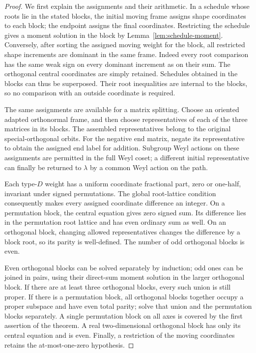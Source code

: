 \begin{proof}
We first explain the assignments and their arithmetic.  In a schedule
whose roots lie in the stated blocks, the initial moving frame assigns
shape coordinates to each block; the endpoint assigns the final
coordinates.  Restricting the schedule gives a moment solution in the
block by Lemma~\ref{lem:schedule-moment}.  Conversely, after sorting the
assigned moving weight for the block, all restricted shape increments
are dominant in the same frame.  Indeed every root comparison has the
same weak sign on every dominant increment as on their sum.  The
orthogonal central coordinates are simply retained.  Schedules obtained
in the blocks can thus be superposed.  Their root inequalities are
internal to the blocks, so no comparison with an outside coordinate is
required.

The same assignments are available for a matrix splitting.  Choose an
oriented adapted orthonormal frame, and then choose representatives of
each of the three matrices in its blocks.  The assembled representatives
belong to the original special-orthogonal orbits.  For the negative end
matrix, negate its representative to obtain the assigned end label for
addition.  Subgroup Weyl actions on these assignments are permitted in
the full Weyl coset; a different initial representative can finally be
returned to \(\lambda\) by a common Weyl action on the path.

Each type-\(D\) weight has a uniform coordinate fractional part, zero or
one-half, invariant under signed permutations.  The global root-lattice
condition consequently makes every assigned coordinate difference an
integer.  On a permutation block, the central equation gives zero
signed sum.  Its difference lies in the permutation root lattice and
has even ordinary sum as well.  On an orthogonal block, changing allowed
representatives changes the difference by a block root, so its parity
is well-defined.  The number of odd orthogonal blocks is even.

Even orthogonal blocks can be solved separately by induction; odd ones
can be joined in pairs, using their direct-sum moment solution in the
larger orthogonal block.  If there are at least three orthogonal blocks,
every such union is still proper.  If there is a permutation block, all
orthogonal blocks together occupy a proper subspace and have even total
parity; solve that union and the permutation blocks separately.  A
single permutation block on all axes is covered by the first assertion
of the theorem.  A real two-dimensional orthogonal block has only its
central equation and is even.  Finally, a restriction of the moving
coordinates retains the at-most-one-zero hypothesis.
\end{proof}

